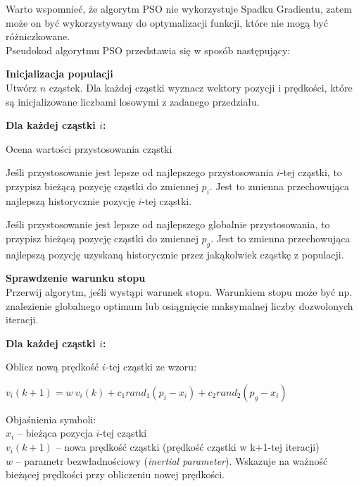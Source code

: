 Warto wspomnieć, że algorytm PSO nie wykorzystuje Spadku Gradientu, zatem może on być wykorzystywany do optymalizacji funkcji, które nie mogą być różniczkowane. \\
\newpage
Pseudokod algorytmu PSO przedstawia się w sposób następujący:
\begin{enumerate*}
\item \textbf{Inicjalizacja populacji} \\
Utwórz $n$ cząstek. Dla każdej cząstki wyznacz wektory pozycji i prędkości, które są inicjalizowane liczbami losowymi z zadanego przedziału.
\item \textbf{Dla każdej cząstki $i$:}
\begin{enumerate*}
\item Ocena wartości przystosowania cząstki
\item Jeśli przystosowanie jest lepsze od najlepszego przystosowania $i$-tej cząstki, to przypisz bieżącą pozycję cząstki do zmiennej $p_i$. Jest to zmienna przechowująca najlepszą historycznie pozycję $i$-tej cząstki.
\item Jeśli przystosowanie jest lepsze od najlepszego globalnie przystosowania, to przypisz bieżącą pozycję cząstki do zmiennej $p_g$. Jest to zmienna przechowująca najlepszą pozycję uzyskaną historycznie przez jakąkolwiek cząstkę z populacji.
\end{enumerate*}
\item \textbf{Sprawdzenie warunku stopu} \\
Przerwij algorytm, jeśli wystąpi warunek stopu. Warunkiem stopu może być np. znalezienie globalnego optimum lub osiągnięcie maksymalnej liczby dozwolonych iteracji.
\item \textbf{Dla każdej cząstki $i$:}
\begin{enumerate*}
\item Oblicz nową prędkość $i$-tej cząstki ze wzoru: \\
\begin{center}
\begin{Large}
$v_i(k+1) = w\ v_i(k) + c_1rand_1(p_i - x_i) + c_2rand_2(p_g - x_i)$
\end{Large}
\end{center}
\vspace{0.5cm}
Objaśnienia symboli: \\
$x_i$ -- bieżąca pozycja $i$-tej cząstki \\
$v_i(k+1)$ -- nowa prędkość cząstki (prędkość cząstki w k+1-tej iteracji) \\
$w$ -- parametr bezwładnościowy (\textit{inertial parameter}). Wskazuje na ważność bieżącej prędkości przy obliczeniu nowej prędkości. \\

\end{enumerate*}
\end{enumerate*}
